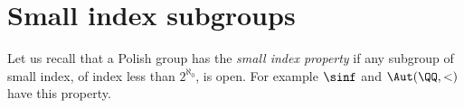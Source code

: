 \section{Small index subgroups}
Let us recall that a Polish group has the \emph{small index property} if any subgroup of small index, \ie of index less than $2^{\aleph_0}$, is open. For example $\sinf$ and $\Aut(\QQ,<)$ have this property.
